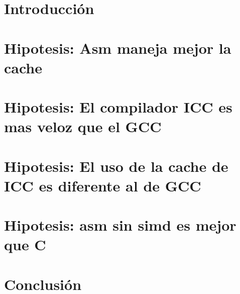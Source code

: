 \documentclass[10pt,a4paper]{article}
\begin{document}
\fecha{\today}



\maketitle

\newpage
\tableofcontents		%

\newpage
\section{Introducción}



\section{Hipotesis: Asm maneja mejor la cache}


\section{Hipotesis: El compilador ICC es mas veloz que el GCC}



\section{Hipotesis: El uso de la cache de ICC es diferente al de GCC}


\newpage
\section{Hipotesis: asm sin simd es mejor que C}



\newpage
\section{Conclusión}

\end{document}
